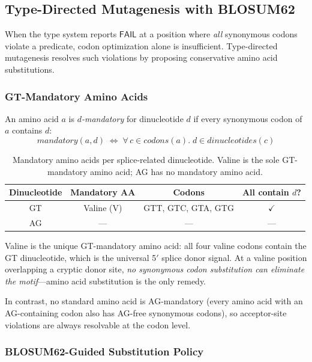 \documentclass[sigplan,10pt,manuscript,review,anonymous]{acmart}
\newcommand{\FAIL}{\ensuremath{\mathsf{FAIL}}\xspace}
\begin{document}
\subsection{Type-Directed Mutagenesis with BLOSUM62}\label{sec:mut}

When the type system reports \FAIL{} at a position where \emph{all}
synonymous codons violate a predicate, codon optimization alone is
insufficient.
Type-directed mutagenesis resolves such violations by proposing
conservative amino acid substitutions.

\subsubsection{GT-Mandatory Amino Acids}

\begin{definition}
An amino acid $a$ is \emph{$d$-mandatory} for dinucleotide $d$ if
every synonymous codon of $a$ contains $d$:
\[
  \mathit{mandatory}(a, d) \;\iff\;
  \forall\, c \in \mathit{codons}(a).\; d \in \mathit{dinucleotides}(c)
\]
\end{definition}

\begin{table}[t]
\centering
\caption{Mandatory amino acids per splice-related dinucleotide.
         Valine is the sole GT-mandatory amino acid;
         AG has no mandatory amino acid.}
\label{tab:mandatory}
\begin{tabular}{cccc}
\toprule
\textbf{Dinucleotide} & \textbf{Mandatory AA} & \textbf{Codons} &
  \textbf{All contain $d$?} \\
\midrule
GT & Valine (V) & GTT, GTC, GTA, GTG & $\checkmark$ \\
AG & --- & --- & --- \\
\bottomrule
\end{tabular}
\end{table}

Valine is the unique GT-mandatory amino acid: all four valine codons
contain the GT dinucleotide, which is the universal 5$'$ splice donor
signal.
At a valine position overlapping a cryptic donor site, \emph{no
synonymous codon substitution can eliminate the motif}---amino acid
substitution is the only remedy.

In contrast, no standard amino acid is AG-mandatory (every amino acid
with an AG-containing codon also has AG-free synonymous codons), so
acceptor-site violations are always resolvable at the codon level.

\subsubsection{BLOSUM62-Guided Substitution Policy}
\end{document}

